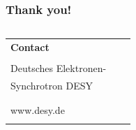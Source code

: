 \begin{frame}
\frametitle{Thank you!}
\vfill{}
\vspace*{3.5cm}


\fontsize{8}{9}\selectfont
\begin{columns}
	\hspace*{-0.8em}
	\hspace*{-1em}  %
	\begin{column}{\textwidth}
		\begin{tabular}{lll}
		\textbf{Contact}&\hspace*{0.5cm} & \\
						&\hspace*{0.5cm} & \\
		\hspace*{-0.4mm}Deutsches Elektronen-&\hspace*{0.5cm} & \AUTHOR\\
		\hspace*{-0.4mm}Synchrotron DESY&\hspace*{0.5cm} & \ORCiD{\ORCID}\\
							&\hspace*{0.5cm} & \GROUP\\
							&\hspace*{0.5cm} & \MailTo{\EMAIL}\\
		\hspace*{-0.4mm}www.desy.de			&\hspace*{0.5cm} & \PHONE\\
							&\hspace*{0.5cm} & \DOIlink{\DOI}\\
		\end{tabular}
	\end{column}
\end{columns}


\end{frame}


